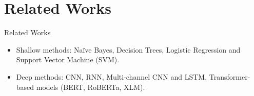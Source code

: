 \section{Related Works}
\begin{frame}{Related Works}
\begin{itemize}
\item Shallow methods: Na\"ive Bayes\cite{Xu2017}, Decision Trees\cite{Safavian1991}, Logistic Regression\cite{Genkin2007} and Support Vector Machine (SVM)\cite{boser1992, cortesvapnik1995}.
\item Deep methods: CNN\cite{Kim2014}, RNN\cite{Sutskever2014}, Multi-channel CNN and LSTM\cite{Vo2017}, Transformer-based models (BERT\cite{Devlin2019}, RoBERTa\cite{Liu2019}, XLM\cite{Conneau2020}).
\end{itemize}
\end{frame}